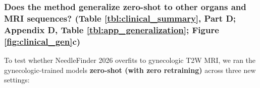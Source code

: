 \documentclass[
  11pt,
]{article}
\begin{document}
\subsubsection{\texorpdfstring{Does the method generalize zero-shot to
other organs and MRI sequences? (Table \ref{tbl:clinical_summary}, Part
D; Appendix D, Table \ref{tbl:app_generalization}; Figure
\ref{fig:clinical_gen}c)}{Does the method generalize zero-shot to other organs and MRI sequences? (Table , Part D; Appendix D, Table ; Figure c)}}\label{does-the-method-generalize-zero-shot-to-other-organs-and-mri-sequences-table-part-d-appendix-d-table-figure-c}

To test whether NeedleFinder 2026 overfits to gynecologic T2W MRI, we
ran the gynecologic-trained models \textbf{zero-shot (with zero
retraining)} across three new settings:
\end{document}
